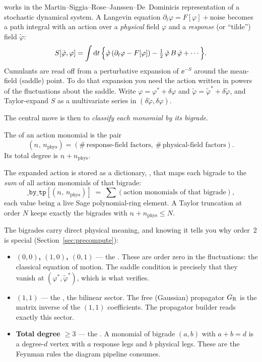 \Daedalus{} works in the Martin--Siggia--Rose--Janssen--De~Dominicis
representation of a stochastic dynamical system. A Langevin equation
$\partial_t\varphi = F[\varphi] + \text{noise}$ becomes a path integral with an
action over a \emph{physical} field $\varphi$ and a \emph{response} (or
``tilde'') field $\tilde\varphi$:
\begin{equation}
  S[\tilde\varphi,\varphi]
  = \int \mathrm{d} t\,
    \Big\{
      \tilde\varphi\,(\partial_t\varphi - F[\varphi])
      - \tfrac12\,\tilde\varphi\,B\,\tilde\varphi + \cdots
    \Big\}.
  \label{eq:msrjd-action}
\end{equation}
Cumulants are read off from a perturbative expansion of $\ee^{-S}$ around the
mean-field (saddle) point. To do that expansion you need the action written in
powers of the fluctuations about the saddle. Write
$\varphi = \varphi^{*} + \delta\varphi$ and
$\tilde\varphi = \tilde\varphi^{*} + \delta\tilde\varphi$, and Taylor-expand $S$
as a multivariate series in $(\delta\tilde\varphi, \delta\varphi)$.

The central move is then to \emph{classify each monomial by its bigrade}.

\begin{defn}
The  of an action monomial is the pair
\[
  (n_{\tilde{}},\, n_{\mathrm{phys}})
  = (\#\,\text{response-field factors},\ \#\,\text{physical-field factors}).
\]
Its total degree is $n_{\tilde{}} + n_{\mathrm{phys}}$.
\end{defn}

The expanded action is stored as a dictionary, , that maps
each bigrade to the \emph{sum} of all action monomials of that bigrade:
\[
  \texttt{\_by\_tp}[(n_{\tilde{}},\, n_{\mathrm{phys}})]
  \;=\; \sum (\text{action monomials of that bigrade}),
\]
each value being a live Sage polynomial-ring element. A Taylor truncation at
order $N$ keeps exactly the bigrades with
$n_{\tilde{}} + n_{\mathrm{phys}} \le N$.

The bigrades carry direct physical meaning, and knowing it tells you why
order~2 is special (Section~\ref{sec:precompute}):

\begin{itemize}
  \item \textbf{$(0,0)$, $(1,0)$, $(0,1)$} --- the . These are order zero in the fluctuations: the classical
        equation of motion. The saddle condition is precisely that they vanish
        at $(\varphi^{*}, \tilde\varphi^{*})$, which is what
         verifies.
  \item \textbf{$(1,1)$} --- the , the bilinear sector.
        The free (Gaussian) propagator $G_{\mathrm R}$ is the matrix inverse of the
        $(1,1)$ coefficients. The propagator builder reads exactly this sector.
  \item \textbf{Total degree $\ge 3$} --- the . A
        monomial of bigrade $(a,b)$ with $a+b=d$ is a degree-$d$ vertex with
        $a$ response legs and $b$ physical legs. These are the Feynman rules
        the diagram pipeline consumes.
\end{itemize}

